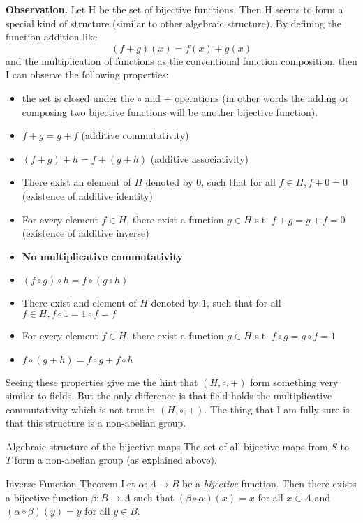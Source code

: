 \textbf{Observation.} Let H be the set of bijective functions. Then H seems to form a special kind of structure (similar to other algebraic structure). By defining the function addition like \[ (f+g)(x) = f(x) + g(x) \] and the multiplication of functions as the conventional function composition, then I can observe the following properties:
\begin{itemize}
	\item the set is closed under the $\circ$ and $+$ operations (in other words the adding or composing two bijective functions will be another bijective function).
	\item $f+g = g+f$ (additive commutativity)
	\item $(f+g)+h = f+(g+h)$ (additive associativity)
	\item There exist an element of $H$ denoted by 0, such that for all $f \in H, f+0 = 0$ (existence of additive identity)
	\item For every element $f \in H$, there exist a function $g \in H$ s.t. $f+g = g+f = 0$ (existence of additive inverse)
	\item \textbf{No multiplicative commutativity}
	\item $(f \circ g) \circ h = f \circ (g \circ h)$
	\item There exist and element of $H$ denoted by $1$, such that for all $f \in H, f \circ 1 = 1 \circ f = f$
	\item For every element $f \in H$, there exist a function $g \in H$ s.t. $f \circ g = g \circ f = 1$
	\item $f \circ (g+h) = f \circ g + f \circ h$
\end{itemize}

Seeing these properties give me the hint that $(H,\circ,+)$ form something very similar to fields. But the only difference is that field holds the multiplicative commutativity which is not true in $(H,\circ,+)$. The thing that I am fully sure is that this structure is a non-abelian group.

\begin{thmbox}{Algebraic structure of the bijective maps}
	The set of all bijective maps from $S$ to $T$ form a non-abelian group (as explained above).
\end{thmbox}

\begin{thmbox}{Inverse Function Theorem}
	Let $\alpha: A \rightarrow B$ be a \textit{bijective} function. Then there exists a bijective function $\beta: B \rightarrow A$ such that $(\beta \circ \alpha)(x) = x$ for all $x \in A$ and $(\alpha \circ \beta)(y) = y$ for all $y \in B$. 
\end{thmbox}

